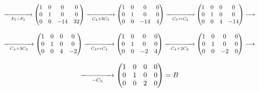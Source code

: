 \documentclass[twoside]{report}
\theoremstyle{mystyle}
\begin{document}
$$
\underset{F_{3} - F_{2}}{\xrightarrow{\hspace{15mm}}}
\begin{pmatrix}
1 & 0 & 0 & 0\\
0 & 1 & 0 & 0\\
0 & 0 & -14 & 32 
\end{pmatrix}
\underset{C_{4} + 2C_{3}}{\xrightarrow{\hspace{15mm}}}
\begin{pmatrix}
1 & 0 & 0 & 0\\
0 & 1 & 0 & 0\\
0 & 0 & -14 & 4
\end{pmatrix}
\underset{C_{3} \leftrightarrow C_{4}}{\xrightarrow{\hspace{15mm}}}
\begin{pmatrix}
1 & 0 & 0 & 0\\
0 & 1 & 0 & 0\\
0 & 0 & 4 & -14
\end{pmatrix}
\longrightarrow
$$

\vspace{3mm}

$$
\underset{C_{4} + 3C_{3}}{\xrightarrow{\hspace{15mm}}}
\begin{pmatrix}
1 & 0 & 0 & 0\\
0 & 1 & 0 & 0\\
0 & 0 & 4 & -2
\end{pmatrix}
\underset{C_{3} \leftrightarrow C_{4}}{\xrightarrow{\hspace{15mm}}}
\begin{pmatrix}
1 & 0 & 0 & 0\\
0 & 1 & 0 & 0\\
0 & 0 & -2 & 4
\end{pmatrix}
\underset{C_{4} + 2C_{3}}{\xrightarrow{\hspace{15mm}}}
\begin{pmatrix}
1 & 0 & 0 & 0\\
0 & 1 & 0 & 0\\
0 & 0 & -2 & 0
\end{pmatrix}
\longrightarrow
$$

\vspace{3mm}

$$
\underset{-C_{3}}{\xrightarrow{\hspace{15mm}}}
\begin{pmatrix}
1 & 0 & 0 & 0\\
0 & 1 & 0 & 0\\
0 & 0 & 2 & 0
\end{pmatrix}
= B
$$
\end{document}
